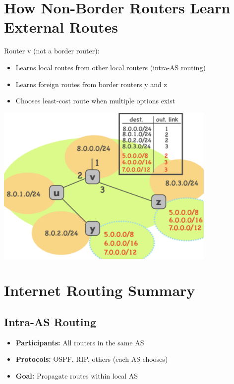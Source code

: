 \documentclass[../../compsys.tex]{subfiles}
\begin{document}
\section{How Non-Border Routers Learn External Routes}
Router v (not a border router):\\
\begin{minipage}[htp]{0.5\textwidth}
\begin{itemize}
    \item Learns local routes from other local routers (intra-AS routing)
    \item Learns foreign routes from border routers y and z
    \item Chooses least-cost route when multiple options exist
\end{itemize}
\end{minipage}
\begin{minipage}[htp]{0.5\textwidth}
\begin{center}
    \includegraphics[width=0.8\textwidth]{images/example-as-4.png}
\end{center}
\end{minipage}



\section{Internet Routing Summary}
\subsection{Intra-AS Routing}
\begin{itemize}
    \item \textbf{Participants:} All routers in the same AS
    \item \textbf{Protocols:} OSPF, RIP, others (each AS chooses)
    \item \textbf{Goal:} Propagate routes within local AS
\end{itemize}
\end{document}
